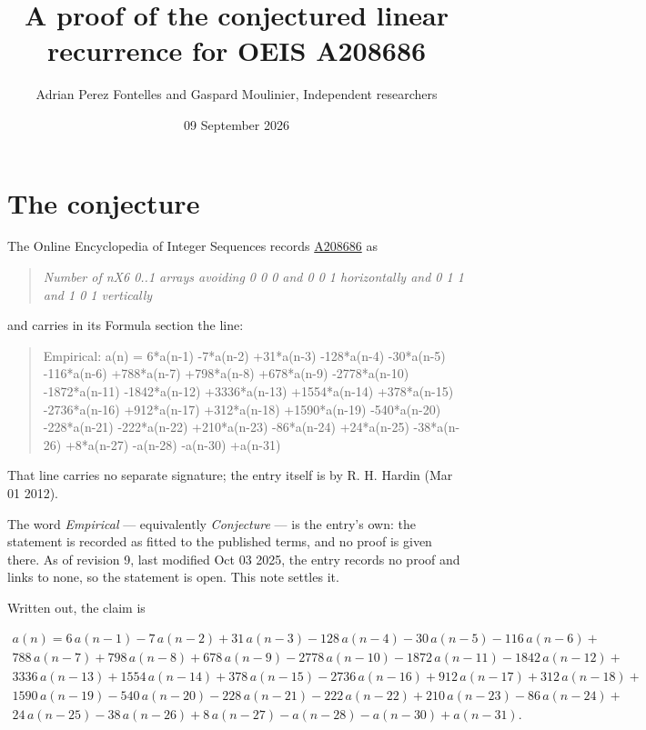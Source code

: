 \documentclass[11pt]{article}
\title{A proof of the conjectured linear recurrence for OEIS A208686}
\author{Adrian Perez Fontelles and Gaspard Moulinier, Independent researchers}
\date{09 September 2026}
\theoremstyle{definition}
\begin{document}
\maketitle
\section{The conjecture}

The Online Encyclopedia of Integer Sequences records \href{https://oeis.org/A208686}{A208686} as

\begin{quote}\itshape Number of nX6 0..1 arrays avoiding 0 0 0 and 0 0 1 horizontally and 0 1 1 and 1 0 1 vertically\end{quote}

and carries in its Formula section the line:

\begin{quote}\ttfamily Empirical: a(n) = 6*a(n-1) -7*a(n-2) +31*a(n-3) -128*a(n-4) -30*a(n-5) -116*a(n-6) +788*a(n-7) +798*a(n-8) +678*a(n-9) -2778*a(n-10) -1872*a(n-11) -1842*a(n-12) +3336*a(n-13) +1554*a(n-14) +378*a(n-15) -2736*a(n-16) +912*a(n-17) +312*a(n-18) +1590*a(n-19) -540*a(n-20) -228*a(n-21) -222*a(n-22) +210*a(n-23) -86*a(n-24) +24*a(n-25) -38*a(n-26) +8*a(n-27) -a(n-28) -a(n-30) +a(n-31)\end{quote}

That line carries no separate signature; the entry itself is by R. H. Hardin (Mar 01 2012).

The word {\itshape Empirical} --- equivalently {\itshape Conjecture} --- is the entry's own: the statement is recorded as fitted to the published terms, and no proof is given there. As of revision 9, last modified Oct 03 2025, the entry records no proof and links to none, so the statement is open. This note settles it.

Written out, the claim is

\begin{multline*} a(n) = 6\,a(n-1) - 7\,a(n-2) + 31\,a(n-3) - 128\,a(n-4) - 30\,a(n-5) - 116\,a(n-6) + \\ 788\,a(n-7) + 798\,a(n-8) + 678\,a(n-9) - 2778\,a(n-10) - 1872\,a(n-11) - 1842\,a(n-12) + \\ 3336\,a(n-13) + 1554\,a(n-14) + 378\,a(n-15) - 2736\,a(n-16) + 912\,a(n-17) + 312\,a(n-18) + \\ 1590\,a(n-19) - 540\,a(n-20) - 228\,a(n-21) - 222\,a(n-22) + 210\,a(n-23) - 86\,a(n-24) + \\ 24\,a(n-25) - 38\,a(n-26) + 8\,a(n-27) - a(n-28) - a(n-30) + a(n-31). \end{multline*}
\end{document}
